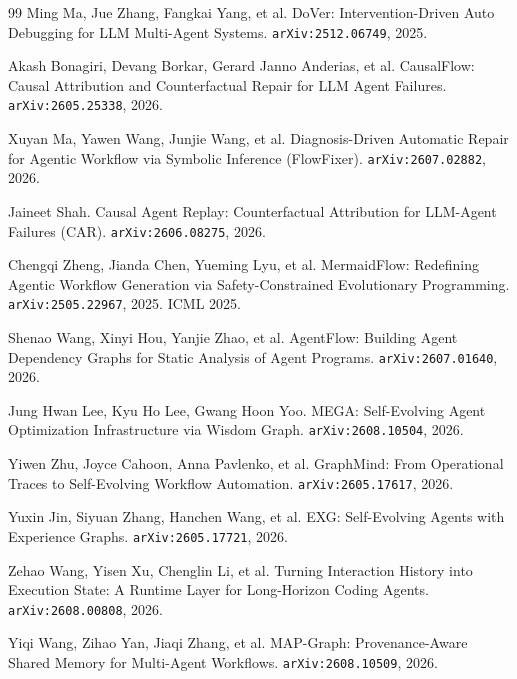 \begin{thebibliography}{99}
 Ming Ma, Jue Zhang, Fangkai Yang, et al. DoVer:
  Intervention-Driven Auto Debugging for LLM Multi-Agent Systems.
  \texttt{arXiv:2512.06749}, 2025.

 Akash Bonagiri, Devang Borkar, Gerard Janno
  Anderias, et al. CausalFlow: Causal Attribution and Counterfactual
  Repair for LLM Agent Failures. \texttt{arXiv:2605.25338}, 2026.

 Xuyan Ma, Yawen Wang, Junjie Wang, et al.
  Diagnosis-Driven Automatic Repair for Agentic Workflow via Symbolic
  Inference (FlowFixer). \texttt{arXiv:2607.02882}, 2026.

 Jaineet Shah. Causal Agent Replay: Counterfactual
  Attribution for LLM-Agent Failures (CAR). \texttt{arXiv:2606.08275},
  2026.

 Chengqi Zheng, Jianda Chen, Yueming Lyu, et al.
  MermaidFlow: Redefining Agentic Workflow Generation via
  Safety-Constrained Evolutionary Programming. \texttt{arXiv:2505.22967},
  2025. ICML 2025.

 Shenao Wang, Xinyi Hou, Yanjie Zhao, et al. AgentFlow:
  Building Agent Dependency Graphs for Static Analysis of Agent Programs.
  \texttt{arXiv:2607.01640}, 2026.

 Jung Hwan Lee, Kyu Ho Lee, Gwang Hoon Yoo. MEGA:
  Self-Evolving Agent Optimization Infrastructure via Wisdom Graph.
  \texttt{arXiv:2608.10504}, 2026.

 Yiwen Zhu, Joyce Cahoon, Anna Pavlenko, et al.
  GraphMind: From Operational Traces to Self-Evolving Workflow
  Automation. \texttt{arXiv:2605.17617}, 2026.

 Yuxin Jin, Siyuan Zhang, Hanchen Wang, et al. EXG:
  Self-Evolving Agents with Experience Graphs. \texttt{arXiv:2605.17721},
  2026.

 Zehao Wang, Yisen Xu, Chenglin Li, et al. Turning
  Interaction History into Execution State: A Runtime Layer for
  Long-Horizon Coding Agents. \texttt{arXiv:2608.00808}, 2026.

 Yiqi Wang, Zihao Yan, Jiaqi Zhang, et al. MAP-Graph:
  Provenance-Aware Shared Memory for Multi-Agent Workflows.
  \texttt{arXiv:2608.10509}, 2026.


\end{thebibliography}
